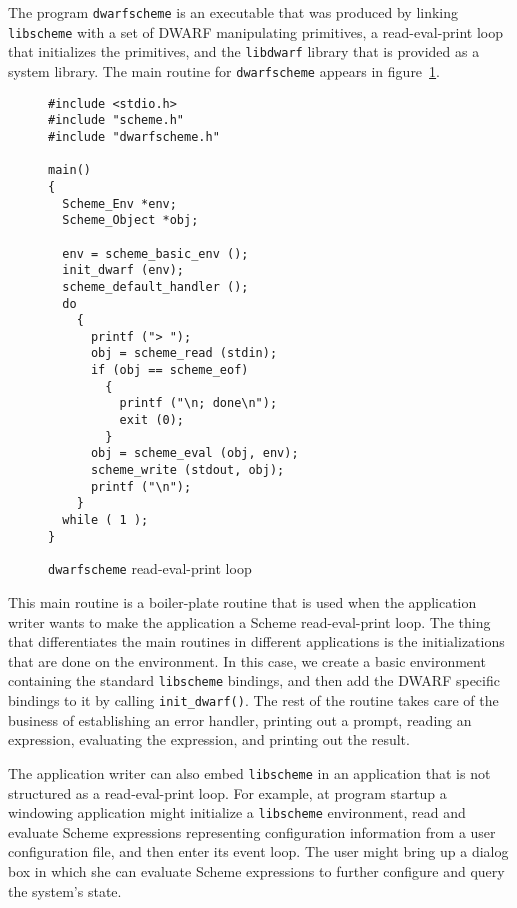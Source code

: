 The program \verb+dwarfscheme+ is an executable that was produced by
linking \verb+libscheme+ with a set of DWARF manipulating primitives,
a read-eval-print loop that initializes the primitives, and the
\verb+libdwarf+ library that is provided as a system library.  The
main routine for \verb+dwarfscheme+ appears in
figure~\ref{fig:simple}.

\begin{figure}[htbp]
\begin{center}
\begin{verbatim}
#include <stdio.h>
#include "scheme.h"
#include "dwarfscheme.h"

main()
{
  Scheme_Env *env;
  Scheme_Object *obj;

  env = scheme_basic_env ();
  init_dwarf (env);
  scheme_default_handler ();
  do
    {
      printf ("> ");
      obj = scheme_read (stdin);
      if (obj == scheme_eof)
        {
          printf ("\n; done\n");
          exit (0);
        }
      obj = scheme_eval (obj, env);
      scheme_write (stdout, obj);
      printf ("\n");
    }
  while ( 1 );
}
\end{verbatim}
\end{center}  
  \caption{{\tt dwarfscheme} read-eval-print loop}
  \label{fig:simple}
\end{figure}

This main routine is a boiler-plate routine that is used when the
application writer wants to make the application a Scheme
read-eval-print loop.  The thing that differentiates the main routines
in different applications is the initializations that are done on the
environment.  In this case, we create a basic environment containing
the standard \verb+libscheme+ bindings, and then add the DWARF
specific bindings to it by calling \verb+init_dwarf()+.  The rest of
the routine takes care of the business of establishing an error
handler, printing out a prompt, reading an expression, evaluating the
expression, and printing out the result.

The application writer can also embed \verb+libscheme+ in an
application that is not structured as a read-eval-print loop.  For
example, at program startup a windowing application might initialize a
\verb+libscheme+ environment, read and evaluate Scheme expressions
representing configuration information from a user configuration file,
and then enter its event loop.  The user might bring up a dialog box
in which she can evaluate Scheme expressions to further configure and
query the system's state.

